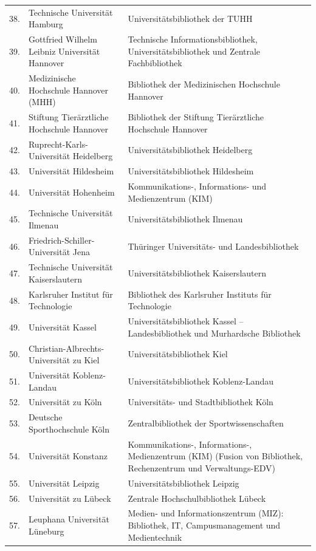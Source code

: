 \documentclass[a4paper,
fontsize=11pt,
oneside,
numbers=noperiodatend,
parskip=half-,
bibliography=totoc,
final
]{scrartcl}
\begin{document}
\begin{longtable}[l]{rp{7cm}p{7.5cm}}
38. & Technische Universität Hamburg & Universitätsbibliothek der TUHH \\
39. & Gottfried Wilhelm Leibniz Universität Hannover & Technische Informationsbibliothek, Universitätsbibliothek und Zentrale Fachbibliothek \\
40. & Medizinische Hochschule Hannover (MHH) & Bibliothek der Medizinischen Hochschule Hannover \\
41. & Stiftung Tierärztliche Hochschule Hannover & Bibliothek der Stiftung Tierärztliche Hochschule Hannover \\
42. & Ruprecht-Karls-Universität Heidelberg & Universitätsbibliothek Heidelberg \\
43. & Universität Hildesheim & Universitätsbibliothek Hildesheim \\
44. & Universität Hohenheim & Kommunikations-, Informations- und Medienzentrum (KIM) \\
45. & Technische Universität Ilmenau & Universitätsbibliothek Ilmenau \\
46. & Friedrich-Schiller-Universität Jena & Thüringer Universitäts- und Landesbibliothek \\
47. & Technische Universität Kaiserslautern & Universitätsbibliothek Kaiserslautern \\
48. & Karlsruher Institut für Technologie & Bibliothek des Karlsruher Instituts für Technologie \\
49. & Universität Kassel & Universitätsbibliothek Kassel -- Landesbibliothek und Murhardsche Bibliothek \\
50. & Christian-Albrechts-Universität zu Kiel & Universitätsbibliothek Kiel \\
51. & Universität Koblenz-Landau & Universitätsbibliothek Koblenz-Landau \\
52. & Universität zu Köln & Universitäts- und Stadtbibliothek Köln \\
53. & Deutsche Sporthochschule Köln & Zentralbibliothek der Sportwissenschaften \\
54. & Universität Konstanz & Kommunikations-, Informations-, Medienzentrum (KIM) (Fusion von Bibliothek, Rechenzentrum und Verwaltungs-EDV) \\
55. & Universität Leipzig & Universitätsbibliothek Leipzig \\
56. & Universität zu Lübeck & Zentrale Hochschulbibliothek Lübeck \\
57. & Leuphana Universität Lüneburg & Medien- und Informationszentrum (MIZ): Bibliothek, IT, Campusmanagement und Medientechnik \\

\end{longtable}
\end{document}

